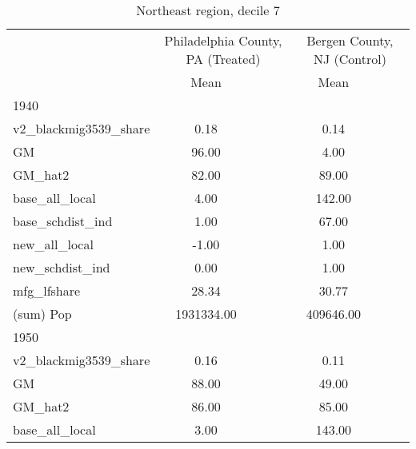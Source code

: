 \begin{table}[htbp]\centering
\def\sym#1{\ifmmode^{#1}\else\(^{#1}\)\fi}
\caption{Northeast region, decile 7 \label{tab1}}
\begin{tabular}{l*{2}{ccc}}
\toprule
                    &\multicolumn{3}{c}{Philadelphia County, PA (Treated)}&\multicolumn{3}{c}{Bergen County, NJ (Control)}\\
                    &        Mean&            &            &        Mean&            &            \\
\midrule
1940                &            &            &            &            &            &            \\
v2\_blackmig3539\_share&        0.18&            &            &        0.14&            &            \\
GM                  &       96.00&            &            &        4.00&            &            \\
GM\_hat2             &       82.00&            &            &       89.00&            &            \\
base\_all\_local      &        4.00&            &            &      142.00&            &            \\
base\_schdist\_ind    &        1.00&            &            &       67.00&            &            \\
new\_all\_local       &       -1.00&            &            &        1.00&            &            \\
new\_schdist\_ind     &        0.00&            &            &        1.00&            &            \\
mfg\_lfshare         &       28.34&            &            &       30.77&            &            \\
(sum) Pop           &  1931334.00&            &            &   409646.00&            &            \\
\midrule
1950                &            &            &            &            &            &            \\
v2\_blackmig3539\_share&        0.16&            &            &        0.11&            &            \\
GM                  &       88.00&            &            &       49.00&            &            \\
GM\_hat2             &       86.00&            &            &       85.00&            &            \\
base\_all\_local      &        3.00&            &            &      143.00&            &            \\

\end{tabular}
\end{table}

